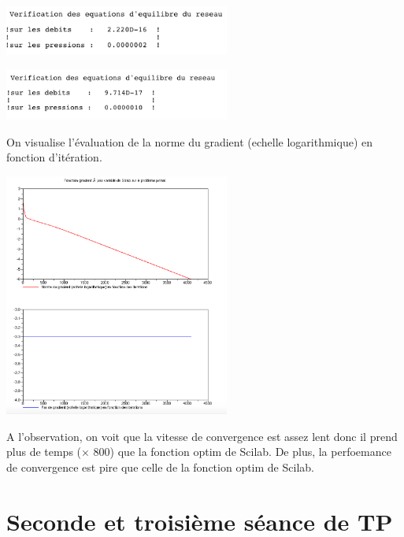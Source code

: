 \begin{minipage}[t]{.5\textwidth}
  \includegraphics[width=20em]{pg_scilab_v.png}
\end{minipage}
\begin{minipage}[t]{.5\textwidth}
  \includegraphics[width=20em]{pg_fix_v.png}
\end{minipage}

\vspace{2em}
On visualise l'évaluation de la norme du gradient (echelle logarithmique) en fonction d'itération.

\begin{center}
  \includegraphics[width=20em]{pg_fix_f.png}
\end{center}

A l'observation, on voit que la vitesse de convergence est assez lent donc il prend plus de temps ($\times$ 800) que la fonction optim de Scilab. De plus, la perfoemance de convergence est pire que celle de la fonction optim de Scilab.

\section{Seconde et troisième séance de TP}


